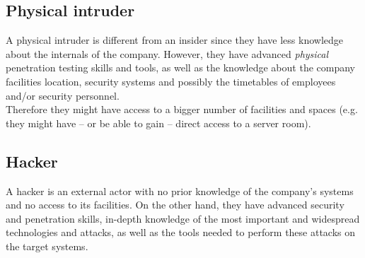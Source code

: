 \subsection*{Physical intruder}
A physical intruder is different from an insider since they have less knowledge about the internals of the company. However, they have advanced \textit{physical} penetration testing skills and tools, as well as the knowledge about the company facilities location, security systems and possibly the timetables of employees and/or security personnel.\\
Therefore they might have access to a bigger number of facilities and spaces (e.g. they might have -- or be able to gain -- direct access to a server room).

\subsection*{Hacker}
A hacker is an external actor with no prior knowledge of the company's systems and no access to its facilities.
On the other hand, they have advanced security and penetration skills, in-depth knowledge of the most important and widespread technologies and attacks, as well as the tools needed to perform these attacks on the target systems.


